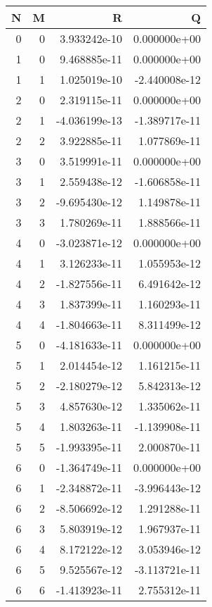 \begin{tabular}{rrrr}
\toprule
   N &    M &             R &             Q \\
\midrule
   0 &    0 &  3.933242e-10 &  0.000000e+00 \\
   1 &    0 &  9.468885e-11 &  0.000000e+00 \\
   1 &    1 &  1.025019e-10 & -2.440008e-12 \\
   2 &    0 &  2.319115e-11 &  0.000000e+00 \\
   2 &    1 & -4.036199e-13 & -1.389717e-11 \\
   2 &    2 &  3.922885e-11 &  1.077869e-11 \\
   3 &    0 &  3.519991e-11 &  0.000000e+00 \\
   3 &    1 &  2.559438e-12 & -1.606858e-11 \\
   3 &    2 & -9.695430e-12 &  1.149878e-11 \\
   3 &    3 &  1.780269e-11 &  1.888566e-11 \\
   4 &    0 & -3.023871e-12 &  0.000000e+00 \\
   4 &    1 &  3.126233e-11 &  1.055953e-12 \\
   4 &    2 & -1.827556e-11 &  6.491642e-12 \\
   4 &    3 &  1.837399e-11 &  1.160293e-11 \\
   4 &    4 & -1.804663e-11 &  8.311499e-12 \\
   5 &    0 & -4.181633e-11 &  0.000000e+00 \\
   5 &    1 &  2.014454e-12 &  1.161215e-11 \\
   5 &    2 & -2.180279e-12 &  5.842313e-12 \\
   5 &    3 &  4.857630e-12 &  1.335062e-11 \\
   5 &    4 &  1.803263e-11 & -1.139908e-11 \\
   5 &    5 & -1.993395e-11 &  2.000870e-11 \\
   6 &    0 & -1.364749e-11 &  0.000000e+00 \\
   6 &    1 & -2.348872e-11 & -3.996443e-12 \\
   6 &    2 & -8.506692e-12 &  1.291288e-11 \\
   6 &    3 &  5.803919e-12 &  1.967937e-11 \\
   6 &    4 &  8.172122e-12 &  3.053946e-12 \\
   6 &    5 &  9.525567e-12 & -3.113721e-11 \\
   6 &    6 & -1.413923e-11 &  2.755312e-11 \\

\end{tabular}
